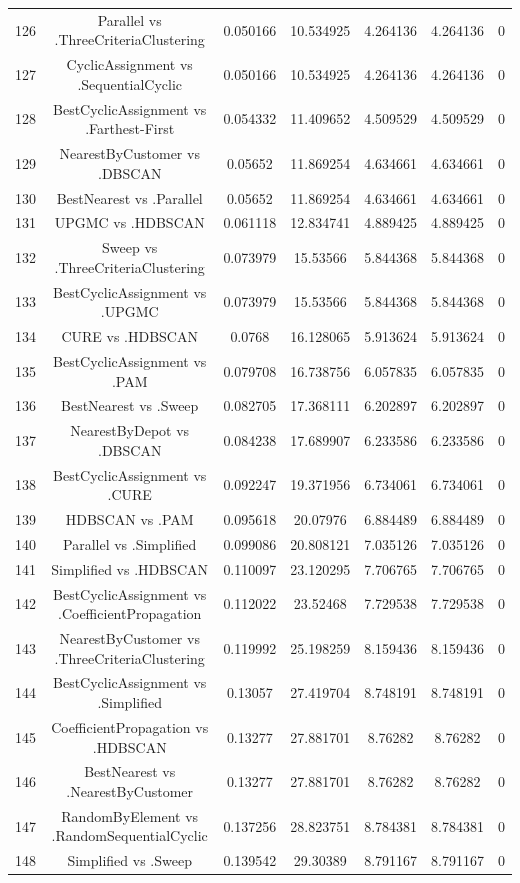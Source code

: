 \documentclass[a4paper,10pt]{article}
\begin{document}
\begin{landscape}
\begin{table}[!htp]
\begin{tabular}{ccccccc}
126&Parallel vs .ThreeCriteriaClustering&0.050166&10.534925&4.264136&4.264136&0\\
127&CyclicAssignment vs .SequentialCyclic&0.050166&10.534925&4.264136&4.264136&0\\
128&BestCyclicAssignment vs .Farthest-First&0.054332&11.409652&4.509529&4.509529&0\\
129&NearestByCustomer vs .DBSCAN&0.05652&11.869254&4.634661&4.634661&0\\
130&BestNearest vs .Parallel&0.05652&11.869254&4.634661&4.634661&0\\
131&UPGMC vs .HDBSCAN&0.061118&12.834741&4.889425&4.889425&0\\
132&Sweep vs .ThreeCriteriaClustering&0.073979&15.53566&5.844368&5.844368&0\\
133&BestCyclicAssignment vs .UPGMC&0.073979&15.53566&5.844368&5.844368&0\\
134&CURE vs .HDBSCAN&0.0768&16.128065&5.913624&5.913624&0\\
135&BestCyclicAssignment vs .PAM&0.079708&16.738756&6.057835&6.057835&0\\
136&BestNearest vs .Sweep&0.082705&17.368111&6.202897&6.202897&0\\
137&NearestByDepot vs .DBSCAN&0.084238&17.689907&6.233586&6.233586&0\\
138&BestCyclicAssignment vs .CURE&0.092247&19.371956&6.734061&6.734061&0\\
139&HDBSCAN vs .PAM&0.095618&20.07976&6.884489&6.884489&0\\
140&Parallel vs .Simplified&0.099086&20.808121&7.035126&7.035126&0\\
141&Simplified vs .HDBSCAN&0.110097&23.120295&7.706765&7.706765&0\\
142&BestCyclicAssignment vs .CoefficientPropagation&0.112022&23.52468&7.729538&7.729538&0\\
143&NearestByCustomer vs .ThreeCriteriaClustering&0.119992&25.198259&8.159436&8.159436&0\\
144&BestCyclicAssignment vs .Simplified&0.13057&27.419704&8.748191&8.748191&0\\
145&CoefficientPropagation vs .HDBSCAN&0.13277&27.881701&8.76282&8.76282&0\\
146&BestNearest vs .NearestByCustomer&0.13277&27.881701&8.76282&8.76282&0\\
147&RandomByElement vs .RandomSequentialCyclic&0.137256&28.823751&8.784381&8.784381&0\\
148&Simplified vs .Sweep&0.139542&29.30389&8.791167&8.791167&0\\

\end{tabular}
\end{table}
\end{landscape}
\end{document}
